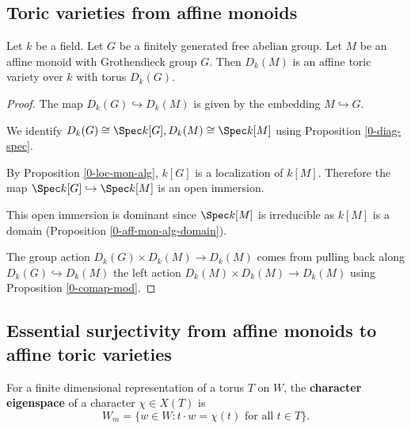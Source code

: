 \subsection{Toric varieties from affine monoids}


\begin{proposition}
  \label{1-1-aff-tor-var-diag-aff-mon}

  Let $k$ be a field.
  Let $G$ be a finitely generated free abelian group.
  Let $M$ be an affine monoid with Grothendieck group $G$.
  Then $D_k(M)$ is an affine toric variety over $k$ with torus $D_k(G)$.
\end{proposition}
\begin{proof}

  The map $D_k(G) \hookrightarrow D_k(M)$ is given by the embedding $M \hookrightarrow G$.

  We identify $D_k(G) \cong \Spec k[G], D_k(M) \cong \Spec k[M]$ using
  Proposition \ref{0-diag-spec}.

  By Proposition \ref{0-loc-mon-alg}, $k[G]$ is a localization of $k[M]$.
  Therefore the map $\Spec k[G] \hookrightarrow \Spec k[M]$ is an open immersion.

  This open immersion is dominant since $\Spec k[M]$ is irreducible as $k[M]$ is a domain
  (Proposition \ref{0-aff-mon-alg-domain}).

  The group action $D_k(G) \times D_k(M) \to D_k(M)$ comes
  from pulling back along $D_k(G) \hookrightarrow D_k(M)$
  the left action $D_k(M) \times D_k(M) \to D_k(M)$ using Proposition \ref{0-comap-mod}.
\end{proof}


\subsection{Essential surjectivity from affine monoids to affine toric varieties}


\begin{definition}
  \label{1-1-char-eigenspace}

  For a finite dimensional representation of a torus $T$ on $W$, the {\bf character eigenspace} of a character $\chi \in X(T)$ is
  \[
    W_m = \{w\in W : t\cdot w = \chi(t)\text{ for all } t\in T \}.
  \]
\end{definition}


